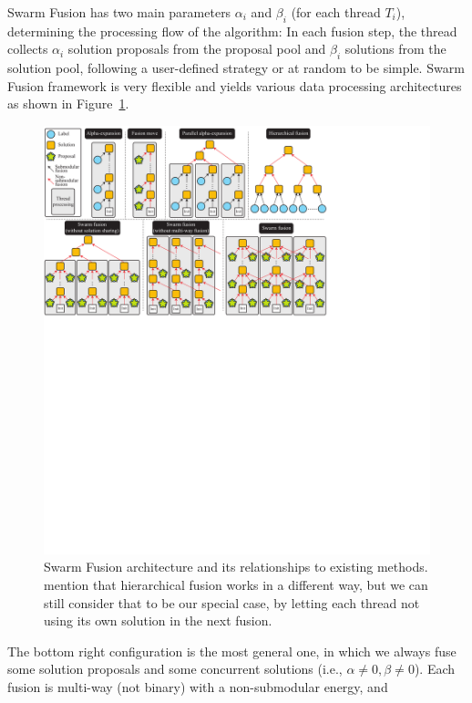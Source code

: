 Swarm Fusion has two main parameters $\alpha_i$ and $\beta_i$ (for each
thread $T_i$), determining the processing flow of the algorithm: In each
fusion step, the thread collects $\alpha_i$ solution proposals from the
proposal pool and $\beta_i$ solutions from the solution pool, following
a user-defined strategy or at random to be simple.
%
Swarm Fusion framework is very flexible and yields various data
processing architectures as shown in Figure~\ref{fig:model}.
%
\begin{figure}[tb]
 \includegraphics[width=\columnwidth]{figure/model.pdf} \caption{Swarm
 Fusion architecture and its relationships to existing methods. mention
 that hierarchical fusion works in a different way, but we can still
 consider that to be our special case, by letting each thread not using
 its own solution in the next fusion.}\label{fig:model}
\end{figure}
%
The bottom right configuration is the most general one, in which we
always fuse some solution proposals and some concurrent solutions
(i.e., $\alpha\ne 0, \beta \ne 0$).
%
Each fusion is multi-way (not binary) with a non-submodular energy, and
